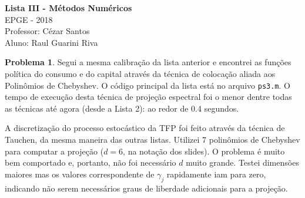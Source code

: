 \documentclass[11pt]{article}
\theoremstyle{definition}
\newtheorem{prob}{Problema}
\theoremstyle{solution}
\begin{document}
	\begin{center}
		{\Large{\textbf{Lista III - Métodos Numéricos}}}\\
		\vspace{0.2cm}
		EPGE - 2018\\
		Professor: Cézar Santos\\
		Aluno: Raul Guarini Riva
	\end{center}
	
\begin{prob}
	Segui a mesma calibração da lista anterior e encontrei as funções política do consumo e do capital através da técnica de colocação aliada aos Polinômios de Chebyshev. O código principal da lista está no arquivo \texttt{ps3.m}. O tempo de execução desta técnica de projeção espectral foi o menor dentre todas as técnicas até agora (desde a Lista 2): ao redor de 0.4 segundos.
	
	A discretização do processo estocástico da TFP foi feito através da técnica de Tauchen, da mesma maneira das outras listas. Utilizei 7 polinômios de Chebyshev para computar a projeção ($d = 6$, na notação dos slides). O problema é muito bem comportado e, portanto, não foi necessário $d$ muito grande. Testei dimensões maiores mas os valores correspondente de $\gamma_{j}$ rapidamente iam para zero, indicando não serem necessários graus de liberdade adicionais para a projeção.
	

\end{prob}
\end{document}
